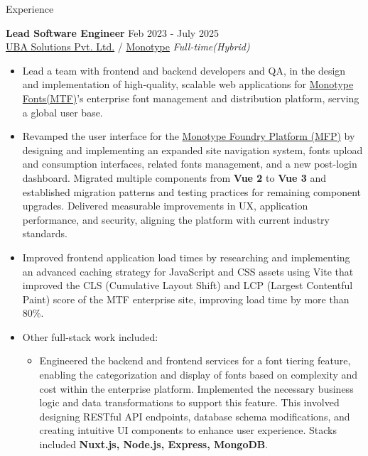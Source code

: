 \documentclass{resume} %
\begin{document}
\begin{rSection}{Experience}

\textbf{Lead Software Engineer} \hfill Feb 2023 - July 2025 \\
\href{https://uba-solutions.com/}{UBA Solutions Pvt. Ltd.} / \href{https://www.monotype.com/}{Monotype} \hfill \textit{Full-time(Hybrid)}
 \begin{itemize}
    \itemsep -3pt {}
    \item Lead a team with frontend and backend developers and QA, in the design and implementation of high-quality, scalable web applications for \href{https://www.monotype.com/}{Monotype Fonts(MTF)}'s enterprise font management and distribution platform, serving a global user base.
     \item Revamped the user interface for the \href{https://fontplatform.monotype.com/}{Monotype Foundry Platform (MFP)} by designing and implementing an expanded site navigation system, fonts upload and consumption interfaces, related fonts management, and a new post-login dashboard. Migrated multiple components from \textbf{Vue 2} to \textbf{Vue 3} and established migration patterns and testing practices for remaining component upgrades. Delivered measurable improvements in UX, application performance, and security, aligning the platform with current industry standards.
     \item Improved frontend application load times by researching and implementing an advanced caching strategy for JavaScript and CSS assets using Vite that improved the CLS (Cumulative Layout Shift) and LCP (Largest Contentful Paint) score of the MTF enterprise site, improving load time by more than 80\%.
     \item Other full-stack work included:
      \begin{itemize}
        \item Engineered the backend and frontend services for a font tiering feature, enabling the categorization and display of fonts based on complexity and cost within the enterprise platform. Implemented the necessary business logic and data transformations to support this feature. This involved designing RESTful API endpoints, database schema modifications, and creating intuitive UI components to enhance user experience. Stacks included \textbf{Nuxt.js, Node.js, Express, MongoDB}.

\end{itemize}
\end{itemize}
\end{rSection}
\end{document}
